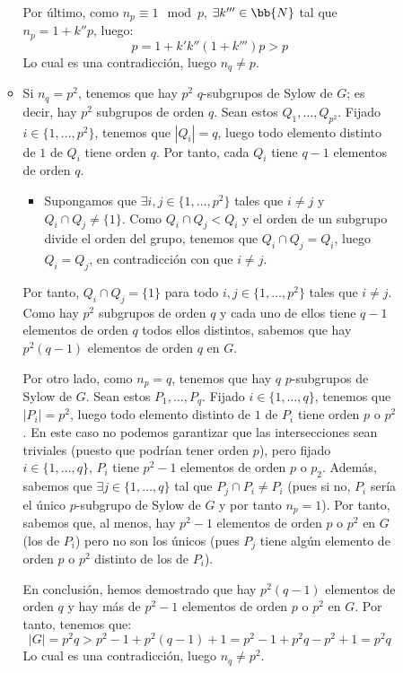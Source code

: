 \begin{ejercicio}
\begin{description}
\begin{itemize}
\begin{itemize}
            Por último, como $n_p\equiv 1 \mod p$, $\exists k'''\in\bb{N}$ tal que $n_p = 1 + k''p$, luego:
            \begin{equation*}
                p = 1 + k'k''(1+k''')p > p
            \end{equation*}
            Lo cual es una contradicción, luego $n_q\neq p$.

            \item Si $n_q=p^2$, tenemos que hay $p^2$ $q$-subgrupos de Sylow de $G$; es decir, hay $p^2$ subgrupos de orden $q$. Sean estos $Q_1,\ldots,Q_{p^2}$. Fijado $i\in \{1,\ldots,p^2\}$, tenemos que $|Q_i|=q$, luego todo elemento distinto de $1$ de $Q_i$ tiene orden $q$. Por tanto, cada $Q_i$ tiene $q-1$ elementos de orden $q$.
            \begin{itemize}
                \item Supongamos que $\exists i,j\in\{1,\ldots,p^2\}$ tales que $i\neq j$ y $Q_i\cap Q_j \neq \{1\}$. Como $Q_i\cap Q_j< Q_i$ y el orden de un subgrupo divide el orden del grupo, tenemos que $Q_i\cap Q_j=Q_i$, luego $Q_i=Q_j$, en contradicción con que $i\neq j$.
            \end{itemize}
            Por tanto, $Q_i\cap Q_j=\{1\}$ para todo $i,j\in\{1,\ldots,p^2\}$ tales que $i\neq j$. Como hay $p^2$ subgrupos de orden $q$ y cada uno de ellos tiene $q-1$ elementos de orden $q$ todos ellos distintos, sabemos que hay $p^2(q-1)$ elementos de orden $q$ en $G$.

            Por otro lado, como $n_p=q$, tenemos que hay $q$ $p$-subgrupos de Sylow de $G$. Sean estos $P_1,\ldots,P_q$. Fijado $i\in \{1,\ldots,q\}$, tenemos que $|P_i|=p^2$, luego todo elemento distinto de $1$ de $P_i$ tiene orden $p$ o $p^2$. En este caso no podemos garantizar que las intersecciones sean triviales (puesto que podrían tener orden $p$), pero fijado $i\in \{1,\ldots,q\}$, $P_i$ tiene $p^2-1$ elementos de orden $p$ o $p_2$. Además, sabemos que $\exists j\in\{1,\ldots,q\}$ tal que $P_j\cap P_i\neq P_i$ (pues si no, $P_i$ sería el único $p$-subgrupo de Sylow de $G$ y por tanto $n_p=1$). Por tanto, sabemos que, al menos, hay $p^2-1$ elementos de orden $p$ o $p^2$ en $G$ (los de $P_i$) pero no son los únicos (pues $P_j$ tiene algún elemento de orden $p$ o $p^2$ distinto de los de $P_i$).

            En conclusión, hemos demostrado que hay $p^2(q-1)$ elementos de orden $q$ y hay más de $p^2-1$ elementos de orden $p$ o $p^2$ en $G$. Por tanto, tenemos que:
            \begin{equation*}
                |G| = p^2q > p^2-1 + p^2(q-1) + 1 = p^2-1 + p^2q - p^2 + 1 = p^2q
            \end{equation*}
            Lo cual es una contradicción, luego $n_q\neq p^2$.
        \end{itemize}


\end{itemize}
\end{description}
\end{ejercicio}

